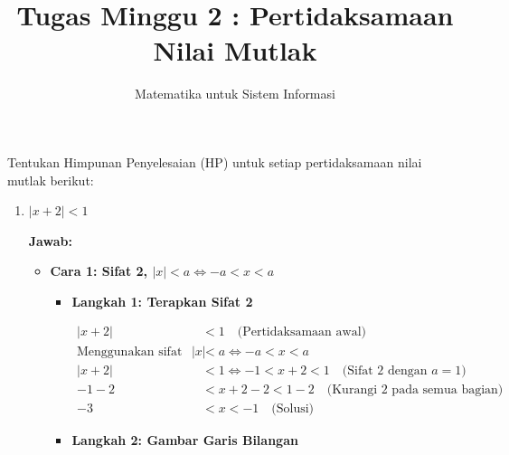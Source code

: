 \documentclass[10pt,a4paper]{article}
\title{Tugas Minggu 2 : Pertidaksamaan Nilai Mutlak}
\author{Matematika untuk Sistem Informasi}
\date{}
\newcounter{eqblock}
\newcommand{\reseteq}{%
  \stepcounter{eqblock}%
  \setcounter{equation}{0}%
  \renewcommand{\theHequation}{\arabic{eqblock}.\arabic{equation}}%
}
\begin{document}
\maketitle

Tentukan Himpunan Penyelesaian (HP) untuk setiap pertidaksamaan nilai mutlak berikut:

\begin{enumerate}

\item $|x + 2| < 1$

\textbf{Jawab:}

\begin{itemize}
\item \textbf{Cara 1: Sifat 2, $|x| < a \iff -a < x < a$}

\begin{itemize}
\item \textbf{Langkah 1: Terapkan Sifat 2}

\reseteq
\begin{align}
|x+2| &< 1 \quad \text{(Pertidaksamaan awal)} \\
\text{Menggunakan sifat 2: } |x| &< a \Leftrightarrow -a < x < a \\
|x+2| &< 1 \Leftrightarrow -1 < x+2 < 1 \quad \text{(Sifat 2 dengan } a = 1) \\
-1 - 2 &< x+2 - 2 < 1 - 2 \quad \text{(Kurangi 2 pada semua bagian)} \\
-3 &< x < -1 \quad \text{(Solusi)}
\end{align}

\item \textbf{Langkah 2: Gambar Garis Bilangan}

\begin{center}
\end{center}
\end{itemize}
\end{itemize}
\end{enumerate}
\end{document}
